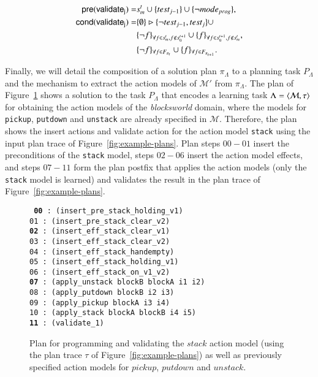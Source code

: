 \begin{small}
	\begin{align*}
	\hspace*{7pt}\mathsf{pre}(\mathsf{validate_{j}})=&s_m^t\cup\{test_{j-1}\}\cup \{\neg mode_{prog}\},\\
	\mathsf{cond}(\mathsf{validate_{j}})=&\{\emptyset\}\rhd\{\neg test_{j-1},test_j\} \cup \\
	&\{\neg f\}_{\forall f\in s_m^t, f \notin s_0^{t+1}}\cup \{f\}_{\forall f\in s_0^{t+1}, f \notin s_m^t},\\
	&\{\neg f\}_{\forall f\in F_{\pi_t}}\cup \{f\}_{\forall f\in F_{\pi_{t+1}}}.\\
	\end{align*}
\end{small}

Finally, we will detail the composition of a solution plan $\pi_\Lambda$ to a planning task $P_\Lambda$ and the mechanism to extract the action models of $\mathcal{M}'$ from $\pi_\Lambda$. The plan of Figure~\ref{fig:plan-lplan} shows a solution to the task $P_{\Lambda}$ that encodes a learning task $\Lambda={\langle \mathcal{M},\tau \rangle}$ for obtaining the action models of the {\em blocksworld} domain, where the models for {\tt\small pickup}, {\tt\small putdown} and {\tt\small unstack} are already specified in $\mathcal{M}$. Therefore, the plan shows the insert actions and validate action for the action model {\tt\small stack} using the input plan trace of Figure~\ref{fig:example-plans}. Plan steps $00-01$ insert the preconditions of the {\tt\small stack} model, steps $02-06$ insert the action model effects, and steps $07-11$ form the plan postfix that applies the action models (only the {\tt\small stack} model is learned) and validates the result in the plan trace of Figure~\ref{fig:example-plans}.

\begin{figure}[hbt!]
	{\footnotesize\tt
		{\bf 00} : (insert\_pre\_stack\_holding\_v1) \\
		01 : (insert\_pre\_stack\_clear\_v2)\\
		{\bf 02} : (insert\_eff\_stack\_clear\_v1)\\
		03 : (insert\_eff\_stack\_clear\_v2)\\
		04 : (insert\_eff\_stack\_handempty)\\
		05 : (insert\_eff\_stack\_holding\_v1)\\
		06 : (insert\_eff\_stack\_on\_v1\_v2)\\
		{\bf 07} : (apply\_unstack blockB blockA i1 i2)\\
		08 : (apply\_putdown blockB i2 i3)\\
		09 : (apply\_pickup blockA i3 i4)\\
		10 : (apply\_stack blockA blockB i4 i5)\\
		{\bf 11} : (validate\_1)
	}
	\caption{\small Plan for programming and validating the $stack$ action model (using the plan trace $\tau$ of Figure~\ref{fig:example-plans}) as well as previously specified action models for $pickup$, $putdown$ and $unstack$.}
	\label{fig:plan-lplan}
\end{figure}

